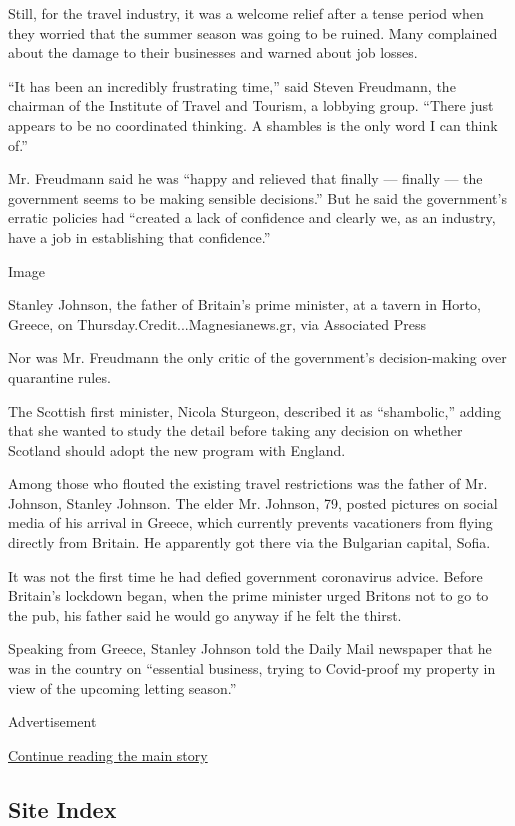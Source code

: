Still, for the travel industry, it was a welcome relief after a tense
period when they worried that the summer season was going to be ruined.
Many complained about the damage to their businesses and warned about
job losses.

``It has been an incredibly frustrating time,'' said Steven Freudmann,
the chairman of the Institute of Travel and Tourism, a lobbying group.
``There just appears to be no coordinated thinking. A shambles is the
only word I can think of.''

Mr. Freudmann said he was ``happy and relieved that finally --- finally
--- the government seems to be making sensible decisions.'' But he said
the government's erratic policies had ``created a lack of confidence and
clearly we, as an industry, have a job in establishing that
confidence.''

Image

Stanley Johnson, the father of Britain's prime minister, at a tavern in
Horto, Greece, on Thursday.Credit...Magnesianews.gr, via Associated
Press

Nor was Mr. Freudmann the only critic of the government's
decision-making over quarantine rules.

The Scottish first minister, Nicola Sturgeon, described it as
``shambolic,'' adding that she wanted to study the detail before taking
any decision on whether Scotland should adopt the new program with
England.

Among those who flouted the existing travel restrictions was the father
of Mr. Johnson, Stanley Johnson. The elder Mr. Johnson, 79, posted
pictures on social media of his arrival in Greece, which currently
prevents vacationers from flying directly from Britain. He apparently
got there via the Bulgarian capital, Sofia.

It was not the first time he had defied government coronavirus advice.
Before Britain's lockdown began, when the prime minister urged Britons
not to go to the pub, his father said he would go anyway if he felt the
thirst.

Speaking from Greece, Stanley Johnson told the Daily Mail newspaper that
he was in the country on ``essential business, trying to Covid-proof my
property in view of the upcoming letting season.''

Advertisement

\protect\hyperlink{after-bottom}{Continue reading the main story}

\hypertarget{site-index}{%
\subsection{Site Index}\label{site-index}}

